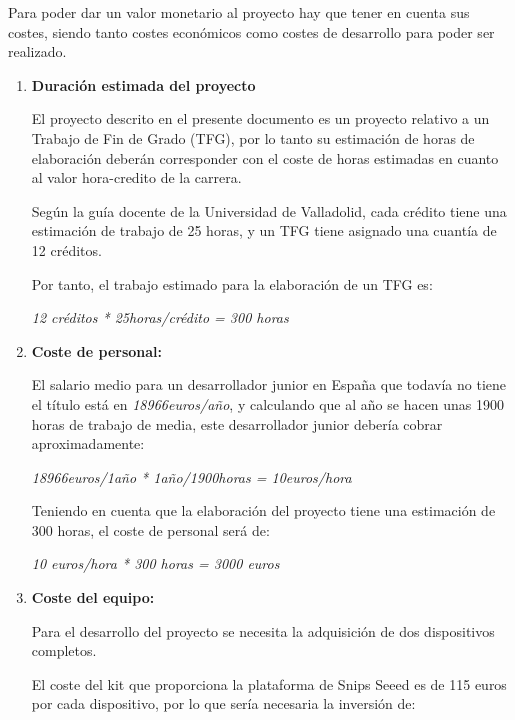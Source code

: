 Para poder dar un valor monetario al proyecto hay que tener en cuenta sus costes, siendo tanto costes económicos como costes de desarrollo para poder ser realizado.

\begin{enumerate}
    \item \textbf{Duración estimada del proyecto} \label{duracion_proyecto}
    
El proyecto descrito en el presente documento es un proyecto relativo a un Trabajo de Fin de Grado (TFG), por lo tanto su estimación de horas de elaboración deberán corresponder con el coste de horas estimadas en cuanto al valor hora-credito de la carrera.

Según la guía docente de la Universidad de Valladolid, cada crédito tiene una estimación de trabajo de 25 horas, y un TFG tiene asignado una cuantía de 12 créditos.

Por tanto, el trabajo estimado para la elaboración de un TFG es:

\begin{center}
    \textit{12 créditos * 25horas/crédito = 300 horas}
\end{center}

    \item\textbf{ Coste de personal:}
    
El salario medio para un desarrollador junior en España que todavía no tiene el título está en \textit{18966euros/año}, y calculando que al año se hacen unas 1900 horas de trabajo de media, este desarrollador junior debería cobrar aproximadamente:

\begin{center}
    \textit{18966euros/1año * 1año/1900horas = 10euros/hora}
\end{center}

Teniendo en cuenta que la elaboración del proyecto tiene una estimación de 300 horas, el coste de personal será de:

\begin{center}
    \textit{10 euros/hora * 300 horas = 3000 euros}
\end{center}

    \item \textbf{ Coste del equipo: }
    
Para el desarrollo del proyecto se necesita la adquisición de dos dispositivos completos.

El coste del kit que proporciona la plataforma de Snips Seeed es de 115 euros por cada dispositivo, por lo que sería necesaria la inversión de:


\end{enumerate}
